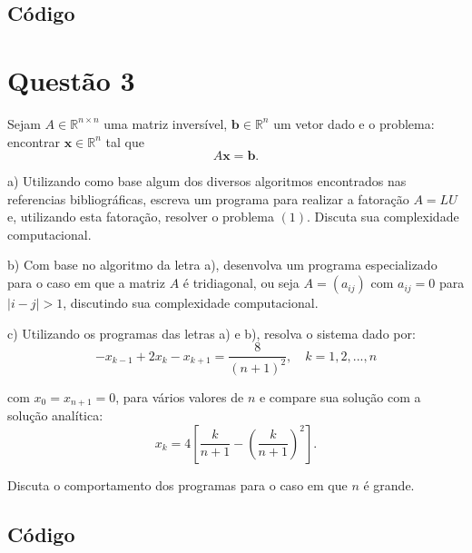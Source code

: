 \documentclass[12pt,a4paper,final]{article}
\begin{document}
\subsection*{Código}




\section{Questão 3}

Sejam $ A \in \mathbb{R}^{n×n} $ uma matriz inversível, $ \mathbf{b} \in \mathbb{R}^{n} $
um vetor dado e o problema: encontrar $ \mathbf{x} \in \mathbb{R}^{n} $ tal que
\begin{equation}
A\mathbf{x} = \mathbf{b}.
\end{equation}

a) Utilizando como base algum dos diversos algoritmos encontrados nas referencias
bibliográficas, escreva um programa para realizar a fatoração $ A = LU $ e, 
utilizando esta fatoração, resolver o problema $ (1). $
Discuta sua complexidade computacional.

b) Com base no algoritmo da letra a), desenvolva um programa especializado para o caso 
em que a matriz $ A $ é tridiagonal, ou seja $ A = (a_{ij}) $ com $ a_{ij} = 0 $ para 
$ |i − j| > 1 $, discutindo sua complexidade computacional.

c) Utilizando os programas das letras a) e b), resolva o sistema dado por:
\[ −x_{k−1} + 2x_k − x_{k+1} = \frac{8}{(n + 1)^2}, \quad k = 1, 2, . . . , n \]

com $ x_0 = x_{n+1} = 0 $, para vários valores de $ n $ e compare sua solução com a
solução analítica:
\[ x_k = 4 \left[ \frac{k}{n+1} - \left( \frac{k}{n+1} \right)^2 \right]. \]

Discuta o comportamento dos programas para o caso em que $ n $ é grande.

\subsection{}

\subsection{}

\subsection*{Código}



\footnotesize{

}
\end{document}
